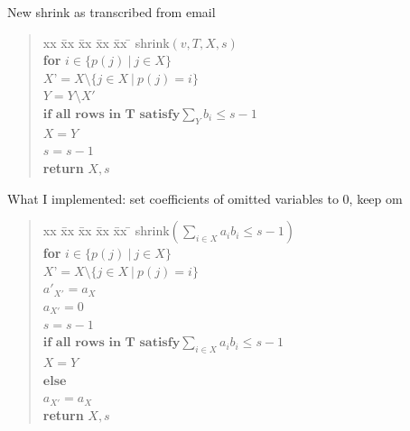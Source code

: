 \documentclass{article}
\begin{document}
New shrink as transcribed from email

\begin{quote} 
\begin{tabbing}
    xx \= xx \= xx \= xx \= xx \= \kill
    \textsf{shrink}$(v,T,X,s)$ \\
    \> \textbf{for }$ i \in \{ p(j) ~|~ j \in X \}$ \\
    \> \> $X’ = X \setminus \{ j \in X ~|~ p(j) = i \}$ \\
    \> \> $Y = Y \setminus X' $ \\
    \> \> $\textbf{if all rows in T satisfy} \sum_{Y} b_i \leq s-1$ \\
    \> \> \> $X = Y$ \\
    \> \> $s = s-1$ \\
    \> \textbf{return} $X,s$ \\
\end{tabbing}
\end{quote}

What I implemented: set coefficients of omitted variables to 0, keep om

\begin{quote} 
\begin{tabbing}
    xx \= xx \= xx \= xx \= xx \= \kill
    \textsf{shrink}$(\sum_{i \in X} a_i b_i \leq s-1)$ \\
    \> \textbf{for }$ i \in \{ p(j) ~|~ j \in X \}$ \\
    \> \> $X’ = X \setminus \{ j \in X ~|~ p(j) = i \}$ \\
    \> \> $a'_{X'} = a_{X}$ \\
    \> \> $a_{X'} = 0$ \\
    \> \> \> $s = s-1$ \\
    \> \> $\textbf{if all rows in T satisfy} \sum_{i \in X} a_i b_i \leq s-1$ \\
    \> \> \> $X = Y$ \\
    \> \> $\textbf{else}$ \\
    \> \> \> $a_{X'} = a_{X}$ \\
    \> \textbf{return} $X,s$ \\
\end{tabbing}
\end{quote}
\end{document}
